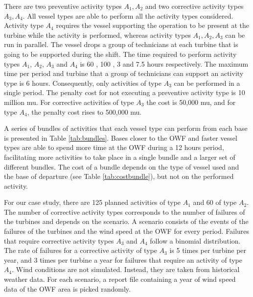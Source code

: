 There are two preventive activity types $A_1,A_2$ and two corrective activity types $A_3, A_4$. All vessel types are able to perform all the activity types considered. Activity type $A_4$ requires the vessel supporting the operation to be present at the turbine while the activity is performed, whereas activity types $A_1,A_2,A_3$ can be run in parallel. The vessel drops a group of technicians at each turbine that is going to be supported during the shift. The time required to perform activity types $A_1$, $A_2$, $A_3$ and $A_4$ is 60 , 100 , 3 and 7.5 hours respectively. The maximum time per period and turbine that a group of technicians can support an activity type is 6 hours. Consequently, only activities of type $A_3$ can be performed in a single period. The penalty cost for not executing a preventive activity type is 10 million mu. For corrective activities of type $A_3$ the cost is 50,000 mu, and for type $A_4$, the penalty cost rises to 500,000 mu.

A series of bundles of activities that each vessel type can perform from each base is presented in Table \ref{tab:bundles}. Bases closer to the OWF and faster vessel types are able to spend more time at the OWF during a 12 hours period, facilitating more activities to take place in a single bundle and a larger set of different bundles. The cost of a bundle depends on the type of vessel used and the base of departure (see Table \ref{tab:costbundle}), but not on the performed activity.

For our case study, there are 125 planned activities of type $A_1$ and 60 of type $A_2$. The number of corrective activity types corresponds to the number of failures of the turbines and depends on the scenario. A scenario consists of the events of the failures of the turbines and the wind speed at the OWF for every period. Failures that require corrective activity types $A_3$ and $A_4$ follow a binomial distribution. The rate of failures for a corrective activity of type $A_3$ is 5 times per turbine per year, and 3 times per turbine a year for failures that require an activity of type $A_4$. Wind conditions are not simulated. Instead, they are taken from historical weather data. For each scenario, a report file containing a year of wind speed data of the OWF area is picked randomly.




